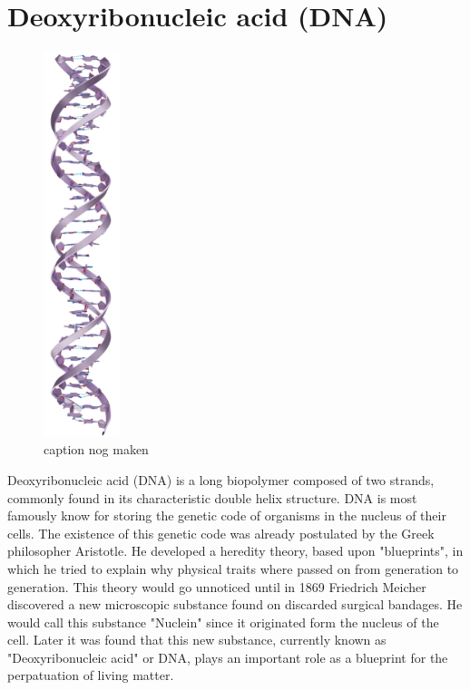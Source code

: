 \section{Deoxyribonucleic acid (DNA)}

\begin{figure}
  \begin{center}
    \includegraphics[width=0.2\textwidth]{Figures/DNAStrand.png}
  \end{center}
  \caption{caption nog maken}
\end{figure}

Deoxyribonucleic acid (DNA) is a long biopolymer composed of two strands, commonly found
in its characteristic double helix structure. DNA is most famously know for storing the
genetic code of organisms in the nucleus of their cells. The existence of this genetic
code was already
postulated by the Greek philosopher Aristotle. He developed a heredity theory, based
upon "blueprints", in which he tried to explain why physical traits where passed on from
generation to generation. This theory would go unnoticed until in 1869
Friedrich Meicher discovered a new microscopic substance found on discarded
surgical bandages. He would call this substance "Nuclein" since it originated
form the nucleus of the cell. Later it was found that this new substance, currently known
as "Deoxyribonucleic acid" or DNA, plays an important role as a blueprint for the
perpatuation of living matter.

